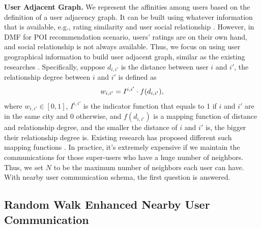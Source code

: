 \textbf{User Adjacent Graph. } 
We represent the affinities among users based on the definition of a user adjacency graph. 
It can be built using whatever information that is available, e.g., rating similarity \cite{su2009survey} and user social relationship \cite{yang2011like}. 
However, in DMF for POI recommendation scenario, users' ratings are on their own hand, and social relationship is not always available. 
Thus, we focus on using user geographical information to build user adjacent graph, similar as the existing researches \cite{ye2011exploiting,cho2011friendship,cheng2012fused}. 
Specifically, suppose %
$d_{i,i'}$ is the distance between user $i$ and $i'$, 
the relationship degree between $i$ and $i'$ is defined as 
\begin{equation}\small
w_{i,i'} = I^{i,i'} \Large \cdot f(d_{i,i'}),
\end{equation} 
where $w_{i,i'} \in [0,1]$, $I^{i,i'}$ is the indicator function that equals to 1 if $i$ and $i'$ are in the same city and 0 otherwise, and $f(d_{i,i'})$ is a mapping function of distance and relationship degree, and the smaller the distance of $i$ and $i'$ is, the bigger their relationship degree is. 
Existing research has proposed different such mapping functions \cite{zhao2016survey}. %
In practice, it's extremely expensive if we maintain the communications for those super-users who have a huge number of neighbors. Thus, we set $N$ to be the maximum number of neighbors each user can have. 
With nearby user communication schema, the first question is answered. 


\subsection{Random Walk Enhanced Nearby User Communication}

